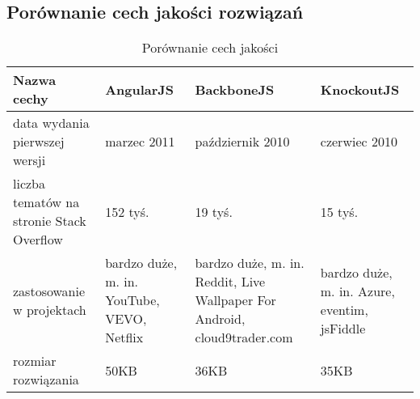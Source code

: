 \subsection{Porównanie cech jakości rozwiązań}
 \begin{table}[h]
	\caption{Porównanie cech jakości}
	\label{tab:heading-styles}
	\begin{tabularx}{\textwidth}{|X|X|X|X|}
		\hline
		Nazwa cechy						& AngularJS 	&  BackboneJS & KnockoutJS	\\ 
		\hline
		data wydania pierwszej wersji 		& marzec 2011 & październik 2010 & czerwiec 2010 	\\  
		\hline
		liczba tematów na stronie Stack Overflow \cite{stack-overflow}	& 152 tyś. & 19 tyś. & 15 tyś. \\ 
		\hline
		zastosowanie w projektach & bardzo duże, m. in. YouTube, VEVO, Netflix & bardzo duże, m. in. Reddit, Live Wallpaper For Android, cloud9trader.com  & bardzo duże, m. in. Azure, eventim, jsFiddle \\ 
		\hline
		rozmiar rozwiązania					& 50KB  & 36KB & 35KB\\
		\hline
	\end{tabularx}
\end{table}
